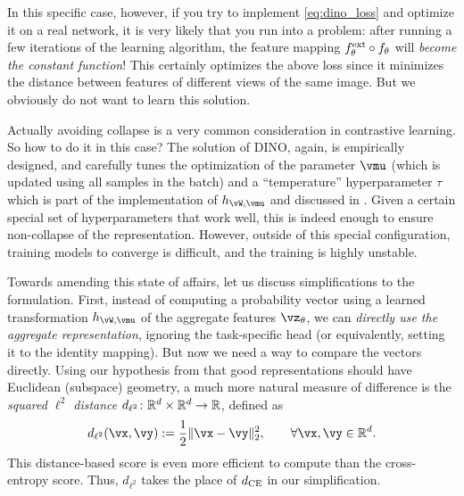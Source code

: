\documentclass[../../book-main.tex]{subfiles}
\begin{document}
In this specific case, however, if you try to implement \eqref{eq:dino_loss} and optimize it on a real network, it is very likely that you run into a problem: after running a few iterations of the learning algorithm, the feature mapping \(f_{\theta}^{\mathrm{ext}} \circ f_{\theta}\) will \textit{become the constant function}! This certainly optimizes the above loss since it minimizes the distance between features of different views of the same image. But we obviously do not want to learn this solution. 

Actually avoiding collapse is a very common consideration in contrastive learning. So how to do it in this case? The solution of DINO, again, is empirically designed, and carefully tunes the optimization of the parameter \(\vmu\) (which is updated using all samples in the batch) and a ``temperature'' hyperparameter \(\tau\) which is part of the implementation of \(h_{\vW, \vmu}\) and discussed in . Given a certain special set of hyperparameters that work well, this is indeed enough to ensure non-collapse of the representation. However, outside of this special configuration, training models to converge is difficult, and the training is highly unstable. 

Towards amending this state of affairs, let us discuss simplifications to the formulation. First, instead of computing a probability vector using a learned transformation \(h_{\vW, \vmu}\) of the aggregate features \(\vz_{\theta}\), we can \textit{directly use the aggregate representation}, ignoring the task-specific head (or equivalently, setting it to the identity mapping). But now we need a way to compare the vectors directly. Using our hypothesis from  that good representations should have Euclidean (subspace) geometry, a much more natural measure of difference is the \textit{squared \(\ell^{2}\) distance} \(d_{\ell^{2}} \colon \mathbb{R}^{d} \times \mathbb{R}^{d} \to \mathbb{R}\), defined as 
\begin{equation}\label{eq:cosine_similarity}
    d_{\ell^{2}}(\vx, \vy) := \frac{1}{2}\norm{\vx - \vy}_{2}^{2}, \qquad  \forall \vx, \vy \in \R^{d}.
\end{equation}
This distance-based score is even more efficient to compute than the cross-entropy score. Thus, \(d_{\ell^{2}}\) takes the place of \(d_{\operatorname{CE}}\) in our simplification. 
\end{document}
